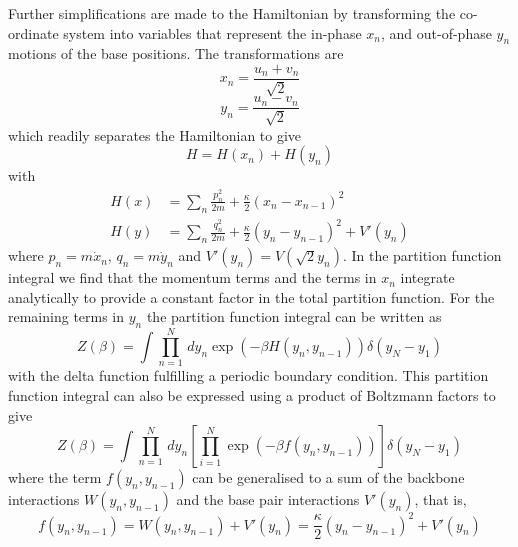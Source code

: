 Further simplifications are made to the Hamiltonian by transforming the co-ordinate system into variables that represent the in-phase $x_{n}$, and out-of-phase $y_{n}$ motions of the base positions. The transformations are \cite{Peyrard1989a}
%
\begin{equation}
x_{n}=\frac{u_{n}+v_{n}}{\sqrt{2}}
\end{equation}
%
\begin{equation}
y_{n}=\frac{u_{n}-v_{n}}{\sqrt{2}}
\end{equation}
%
which readily separates the Hamiltonian to give 
%
\begin{equation}
H = H\left(x_{n}\right) + H\left(y_{n}\right)
\end{equation}
%
with 
%
\begin{align}
H\left(x\right) &= \sum_{n}\frac{p_{n}^{2}}{2m}+\frac{\kappa}{2}\left(x_{n}-x_{n-1}\right)^{2} \\
H\left(y\right) &= \sum_{n}\frac{q_{n}^{2}}{2m}+\frac{\kappa}{2}\left(y_{n}-y_{n-1}\right)^{2} + V'\left(y_{n}\right)
\end{align}
%
where $p_{n}=m\dot{x}_{n}$, $q_{n}=m\dot{y}_{n}$ and $V'\left(y_{n}\right)=V\left(\sqrt{2}y_{n}\right)$. In the partition function integral we find that the momentum terms and the terms in $x_{n}$ integrate analytically to provide a constant factor in the total partition function. For the remaining terms in $y_{n}$ the partition function integral can be written as  \cite{Peyrard1989a}
%
\begin{equation}
Z\left(\beta\right)=\int \prod^{N}_{n=1} \,dy_{n}\exp\left(-\beta H\left(y_{n},y_{n-1}\right) \right)\delta\left(y_{N}-y_{1}\right)
\label{pfi1}
\end{equation}
%
with the delta function fulfilling a periodic boundary condition.  This partition function integral can also be expressed using a product of Boltzmann factors to give
%
\begin{equation}
Z\left(\beta\right)=\int \prod^{N}_{n=1} \,dy_{n}\left[ \prod_{i=1}^{N}\exp\left(-\beta f\left(y_{n},y_{n-1}\right) \right)\right]\delta\left(y_{N}-y_{1}\right)
\label{pfi2}
\end{equation}
%
where the term $f\left(y_{n},y_{n-1}\right)$ can be generalised to a sum of the backbone interactions $W\left(y_{n},y_{n-1}\right)$ and the base pair interactions $V'\left(y_{n}\right)$, that is,
%
\begin{equation}
f\left(y_{n},y_{n-1}\right)= W\left(y_{n},y_{n-1}\right) +V'\left(y_{n}\right) = \frac{\kappa}{2}\left(y_{n}-y_{n-1}\right)^{2} + V'\left(y_{n}\right)
\end{equation}
